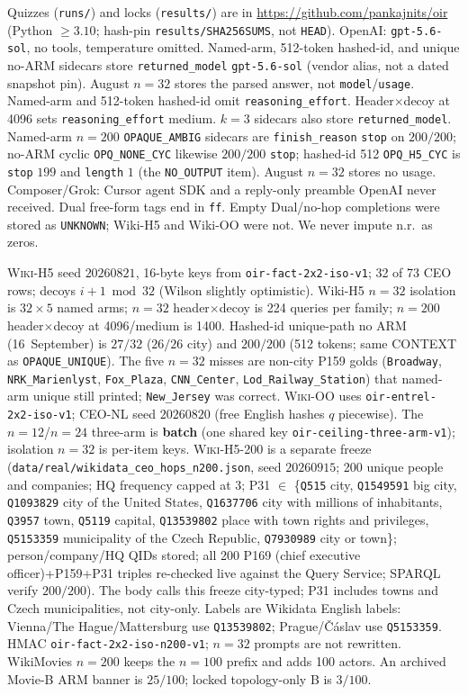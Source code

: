 \documentclass{article}
\begin{document}
Quizzes (\texttt{runs/}) and locks (\texttt{results/}) are in
\url{https://github.com/pankajnits/oir}
(Python $\ge 3.10$; hash-pin \texttt{results/SHA256SUMS}, not \texttt{HEAD}).
OpenAI: \texttt{gpt-5.6-sol}, no tools, temperature omitted.
Named-arm, 512-token hashed-id, and unique no-ARM sidecars store
\texttt{returned\_model} \texttt{gpt-5.6-sol} (vendor alias, not a dated
snapshot pin). August $n{=}32$ stores the parsed answer, not
\texttt{model}/\texttt{usage}.
Named-arm and 512-token hashed-id omit \texttt{reasoning\_effort}.
Header$\times$decoy at 4096 sets \texttt{reasoning\_effort} medium.
$k{=}3$ sidecars also store \texttt{returned\_model}.
Named-arm $n{=}200$ \texttt{OPAQUE\_AMBIG} sidecars are
\texttt{finish\_reason} \texttt{stop} on $200/200$; no-ARM cyclic
\texttt{OPQ\_NONE\_CYC} likewise $200/200$ \texttt{stop}; hashed-id 512
\texttt{OPQ\_H5\_CYC} is \texttt{stop} $199$ and \texttt{length} $1$
(the \texttt{NO\_OUTPUT} item). August $n{=}32$ stores no usage.
Composer/Grok: Cursor agent SDK and a reply-only preamble OpenAI never
received. Dual free-form tags end in \texttt{ff}.
Empty Dual/no-hop completions were stored as \texttt{UNKNOWN}; Wiki-H5 and
Wiki-OO were not. We never impute n.r.\ as zeros.

\textsc{Wiki-H5} seed $20260821$, 16-byte keys from \texttt{oir-fact-2x2-iso-v1};
32 of 73 CEO rows; decoys $i{+}1 \bmod 32$ (Wilson slightly optimistic).
Wiki-H5 $n{=}32$ isolation is $32{\times}5$ named arms; $n{=}32$
header$\times$decoy is 224 queries per family; $n{=}200$ header$\times$decoy
at 4096/medium is 1400.
Hashed-id unique-path no ARM (16~September) is $27/32$ ($26/26$ city) and
$200/200$ (512 tokens; same CONTEXT as \texttt{OPAQUE\_UNIQUE}).
The five $n{=}32$ misses are non-city P159 golds
(\texttt{Broadway}, \texttt{NRK\_Marienlyst}, \texttt{Fox\_Plaza},
\texttt{CNN\_Center}, \texttt{Lod\_Railway\_Station}) that named-arm unique
still printed; \texttt{New\_Jersey} was correct.
\textsc{Wiki-OO} uses \texttt{oir-entrel-2x2-iso-v1}; CEO-NL seed $20260820$
(free English hashes $q$ piecewise).
The $n{=}12$/$n{=}24$ three-arm is \textbf{batch} (one shared key
\texttt{oir-ceiling-three-arm-v1}); isolation $n{=}32$ is per-item keys.
\textsc{Wiki-H5-200} is a separate freeze
(\texttt{data/real/wikidata\_ceo\_hops\_n200.json}, seed $20260915$;
200 unique people and companies; HQ frequency capped at 3;
P31 $\in$ \{\texttt{Q515} city, \texttt{Q1549591} big city,
\texttt{Q1093829} city of the United States,
\texttt{Q1637706} city with millions of inhabitants,
\texttt{Q3957} town, \texttt{Q5119} capital,
\texttt{Q13539802} place with town rights and privileges,
\texttt{Q5153359} municipality of the Czech Republic,
\texttt{Q7930989} city or town\};
person/company/HQ QIDs stored;
all 200 P169 (chief executive officer)+P159+P31 triples re-checked live
against the Query Service; SPARQL verify $200/200$).
The body calls this freeze city-typed; P31 includes towns and Czech
municipalities, not city-only.
Labels are Wikidata English labels: Vienna/The Hague/Mattersburg use
\texttt{Q13539802}; Prague/\v{C}\'aslav use \texttt{Q5153359}.
HMAC \texttt{oir-fact-2x2-iso-n200-v1};
$n{=}32$ prompts are not rewritten.
WikiMovies $n{=}200$ keeps the $n{=}100$ prefix and adds 100 actors.
An archived Movie-B ARM banner is $25/100$; locked topology-only B is
$3/100$.
\end{document}
